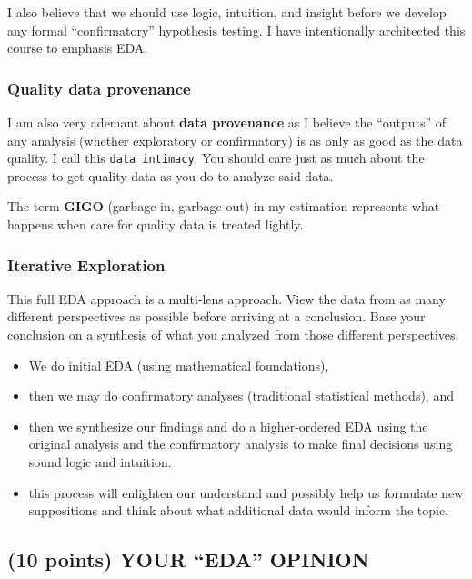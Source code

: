 \documentclass[
]{article}
\providecommand{\tightlist}{%
  \setlength{\itemsep}{0pt}\setlength{\parskip}{0pt}}
\begin{document}
I also believe that we should use logic, intuition, and insight before
we develop any formal ``confirmatory'' hypothesis testing. I have
intentionally architected this course to emphasis EDA.

\hypertarget{quality-data-provenance}{%
\subsubsection{Quality data provenance}\label{quality-data-provenance}}

I am also very ademant about \textbf{data provenance} as I believe the
``outputs'' of any analysis (whether exploratory or confirmatory) is as
only as good as the data quality. I call this \texttt{data\ intimacy}.
You should care just as much about the process to get quality data as
you do to analyze said data.

The term \textbf{GIGO} (garbage-in, garbage-out) in my estimation
represents what happens when care for quality data is treated lightly.

\hypertarget{iterative-exploration}{%
\subsubsection{Iterative Exploration}\label{iterative-exploration}}

This full EDA approach is a multi-lens approach. View the data from as
many different perspectives as possible before arriving at a conclusion.
Base your conclusion on a synthesis of what you analyzed from those
different perspectives.

\begin{itemize}
\tightlist
\item
  We do initial EDA (using mathematical foundations),
\item
  then we may do confirmatory analyses (traditional statistical
  methods), and
\item
  then we synthesize our findings and do a higher-ordered EDA using the
  original analysis and the confirmatory analysis to make final
  decisions using sound logic and intuition.
\item
  this process will enlighten our understand and possibly help us
  formulate new suppositions and think about what additional data would
  inform the topic.
\end{itemize}

\hypertarget{points-your-eda-opinion}{%
\subsection{(10 points) YOUR ``EDA''
OPINION}\label{points-your-eda-opinion}}
\end{document}
